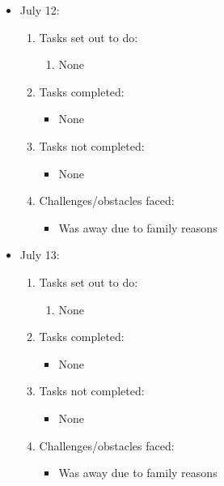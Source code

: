 \documentclass[12pt]{article}
\begin{document}
	\begin{itemize}
		\item July 12:
		\begin{enumerate}
			\item Tasks set out to do:
			\begin{enumerate}
				\item None
			\end{enumerate}
			\item Tasks completed:
			\begin{itemize}
				\item None
			\end{itemize}
			\item Tasks not completed:
			\begin{itemize}
				\item None
			\end{itemize}
			\item Challenges/obstacles faced:
			\begin{itemize}
				\item Was away due to family reasons
			\end{itemize}			
		\end{enumerate}
	\end{itemize}
	
	\begin{itemize}
		\item July 13:
		\begin{enumerate}
			\item Tasks set out to do:
			\begin{enumerate}
				\item None
			\end{enumerate}
			\item Tasks completed:
			\begin{itemize}
				\item None
			\end{itemize}
			\item Tasks not completed:
			\begin{itemize}
				\item None
			\end{itemize}
			\item Challenges/obstacles faced:
			\begin{itemize}
				\item Was away due to family reasons
			\end{itemize}			
		\end{enumerate}
	\end{itemize}
	
\end{document}
